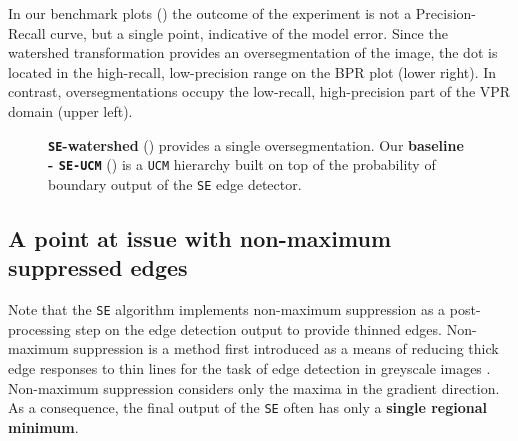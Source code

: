 In our benchmark plots () the outcome of the experiment is not a Precision-Recall curve, but a single point, %
indicative of the model error. Since the watershed transformation provides an oversegmentation of the image, the dot is located in the high-recall, low-precision range on the BPR plot (lower right). In contrast, oversegmentations occupy the low-recall, high-precision part of the VPR domain (upper left). 

\begin{figure}[ht!]
\centering
\caption[{\tt SE}-watershed and baseline: {\tt SE-UCM} plots]{\textbf{\texttt{SE}-watershed} () provides a single oversegmentation. Our \textbf{ baseline - \texttt{SE-UCM}} () is a {\tt UCM} hierarchy built on top of the probability of boundary output of the {\tt SE} edge detector.}
\label{fig:SE-watershed}
\end{figure}

\subsection{A point at issue %
with non-maximum suppressed edges}
\label{sec:ch5-nms-issue}
Note that the {\tt SE} algorithm implements non-maximum suppression as a post-processing step on the edge detection output to provide thinned edges. Non-maximum suppression is a method first introduced as a means of reducing thick edge responses to thin lines for the task of edge detection in greyscale images \cite{Rosenfeld1976digital}. Non-maximum suppression considers only the maxima in the gradient direction. As a consequence, the final output of the {\tt SE} often has only a {\bf single regional minimum}. 


